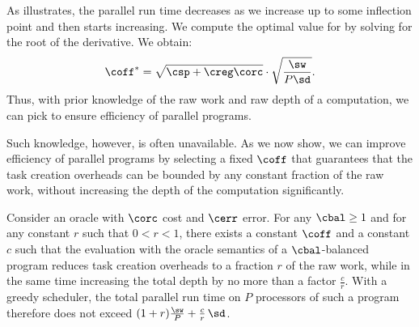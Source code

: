 As  illustrates, the parallel run time
decreases as we increase \coff up to some inflection point and then
starts increasing.  
We compute the optimal value for \coff by solving for the root of the  
derivative. We obtain:
\[
\coff^* = \sqrt{\csp+\creg\corc} \cdot
\sqrt{ \frac{\sw}{P\sd} }.
\]
Thus, with prior knowledge of the raw work and raw depth of a
computation, we can pick \coff to ensure efficiency of parallel
programs.  

Such knowledge, however, is often unavailable.  As we now
show, we can improve efficiency of parallel programs by selecting a
fixed $\coff$ that guarantees that the task creation overheads can be
bounded by any constant fraction of the raw work, without increasing
the depth of the computation significantly. 



\begin{theorem}
\label{thm:task-creation-overheads}
Consider an oracle with $\corc$ cost and $\cerr$ error.
For any $\cbal\geq 1$ and for any constant $r$ such that $0 < r < 1$,
there exists a constant $\coff$ and a constant $c$
such that the evaluation with 
the oracle semantics of a $\cbal$-balanced program 
reduces task creation overheads to a fraction $r$ of the
raw work, while in the same time increasing the total depth 
by no more than a factor $\frac{c}{r}$.
With a greedy scheduler, the total parallel
run time on $P$ processors of such a program
therefore does not exceed
$(1 + r) \frac{\sw}{P} + \frac{c}{r}\, \sd$.  
%
\end{theorem}

